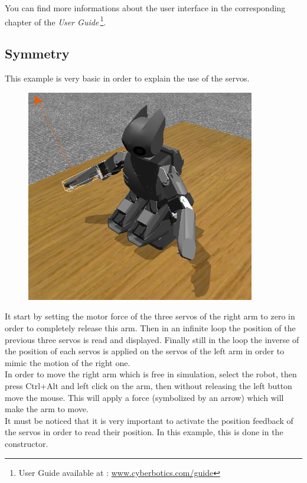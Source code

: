 \documentclass[a4paper, 12pt]{article}  		%
\begin{document}
You can find more informations about the user interface in the corresponding chapter of the \textit{User Guide}\,\footnote{User Guide available at : \url{www.cyberbotics.com/guide}}.

\newpage
\subsection{Symmetry}

This example is very basic in order to explain the use of the servos.\\

\begin{figure}[H]
\begin{center}
\includegraphics[width=10cm]{example_symmetry.png}
\label{example_symmetry.png}
\end{center}
\end{figure}

It start by setting the motor force of the three servos of the right arm to zero in order to completely release this arm.
Then in an infinite loop the position of the previous three servos is read and displayed.
Finally still in the loop the inverse of the position of each servos is applied on the servos of the left arm in order to mimic the motion of the right one.\\
 In order to move the right arm which is free in simulation, select the robot, then press Ctrl+Alt and left click on the arm, then without releasing the left button move the mouse. This will apply a force (symbolized by an arrow) which will make the arm to move.\\
It must be noticed that it is very important to activate the position feedback of the servos in order to read their position. In this example, this is done in the constructor.\\
\end{document}
